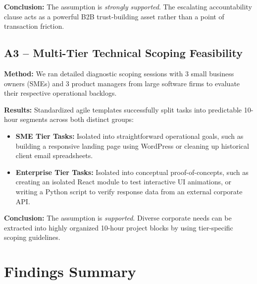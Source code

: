 \documentclass[12pt,a4paper]{article}
\begin{document}
\textbf{Conclusion:} The assumption is \emph{strongly supported}. The escalating accountability clause acts as a powerful B2B trust-building asset rather than a point of transaction friction.

\subsection{A3 -- Multi-Tier Technical Scoping Feasibility}

\textbf{Method:} We ran detailed diagnostic scoping sessions with 3 small business owners (SMEs) and 3 product managers from large software firms to evaluate their respective operational backlogs.

\textbf{Results:} Standardized agile templates successfully split tasks into predictable 10-hour segments across both distinct groups:
\begin{itemize}
    \item \textbf{SME Tier Tasks:} Isolated into straightforward operational goals, such as building a responsive landing page using WordPress or cleaning up historical client email spreadsheets.
    \item \textbf{Enterprise Tier Tasks:} Isolated into conceptual proof-of-concepts, such as creating an isolated React module to test interactive UI animations, or writing a Python script to verify response data from an external corporate API.
\end{itemize}

\textbf{Conclusion:} The assumption is \emph{supported}. Diverse corporate needs can be extracted into highly organized 10-hour project blocks by using tier-specific scoping guidelines.

\section{Findings Summary}
\end{document}
